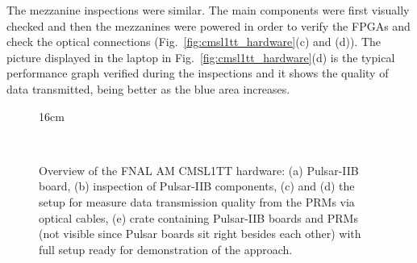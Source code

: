The mezzanine inspections were similar. The main components were first visually checked and then the mezzanines were powered in order to verify the FPGAs and check the optical connections (Fig.~\ref{fig:cmsl1tt_hardware}(c) and (d)). The picture displayed in the laptop in Fig.~\ref{fig:cmsl1tt_hardware}(d) is the typical performance graph verified during the inspections and it shows the quality of data transmitted, being better as the blue area increases.

\begin{figure}[htbp]{16cm}
	\caption{Overview of the FNAL AM CMSL1TT hardware: (a) Pulsar-IIB board, (b) inspection of Pulsar-IIB components, (c) and (d) the setup for measure data transmission quality from the PRMs via optical cables, (e) crate containing Pulsar-IIB boards and PRMs (not visible since Pulsar boards sit right besides each other) with full setup ready for demonstration of the approach.}
	\centering
	\quad
	\\

\end{figure}
